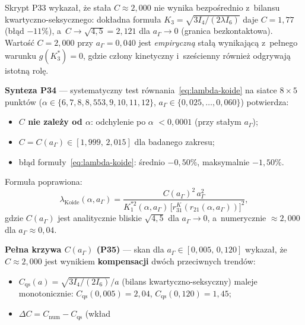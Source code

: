 \begin{problem}
\begin{description}[leftmargin=2em, labelindent=0pt]
\item[Weryfikacja na siatce --- \textbf{P33--P34 (domkni\k{e}te)}:]
  Skrypt P33 wykaza\l{}, \.ze sta\l{}a $C \approx 2{,}000$
  nie wynika bezpo\'srednio z~bilansu kwartyczno-seksycznego:
  dok\l{}adna formu\l{}a $K_3 = \sqrt{3I_4/(2\lambda I_6)}$
  daje $C = 1{,}77$ (b\l{}\k{a}d $-11\%$), a~$C \to \sqrt{4{,}5} = 2{,}121$
  dla $a_\Gamma \to 0$ (granica bezkontaktowa).
  Warto\'s\'c $C = 2{,}000$ przy $a_\Gamma = 0{,}040$ jest
  \emph{empiryczn\k{a}} sta\l{}\k{a} wynikaj\k{a}c\k{a} z~pe\l{}nego
  warunku $g(K_3^*) = 0$, gdzie cz\l{}ony kinetyczny i~sze\'scienny
  r\'ownie\.z odgrywaj\k{a} istotn\k{a} rol\k{e}.
  \par
  \textbf{Synteza P34} --- systematyczny test r\'ownania~\eqref{eq:lambda-koide}
  na siatce $8 \times 5$ punkt\'ow
  ($\alpha \in \{6,7,8,8{,}553,9,10,11,12\}$,
   $a_\Gamma \in \{0{,}025,\ldots,0{,}060\}$)
  potwierdza:
  \begin{itemize}[nosep]
    \item \textbf{$C$ nie zale\.zy od $\alpha$}: odchylenie po $\alpha$
          $< 0{,}0001$ (przy sta\l{}ym $a_\Gamma$);
    \item $C = C(a_\Gamma) \in [1{,}999,\, 2{,}015]$ dla badanego zakresu;
    \item b\l{}\k{a}d formu\l{}y~\eqref{eq:lambda-koide}:
          \'srednio $-0{,}50\%$, maksymalnie $-1{,}50\%$.
  \end{itemize}
  Formu\l{}a poprawiona:
  \begin{equation}\label{eq:lambda-koide-v2}
      \lambda_\mathrm{Koide}(\alpha, a_\Gamma)
      = \frac{C(a_\Gamma)^2\, a_\Gamma^2}
             {K_1^{*2}(\alpha, a_\Gamma)\,
              \bigl[r_{31}^K(r_{21}(\alpha, a_\Gamma))\bigr]^2},
  \end{equation}
  gdzie $C(a_\Gamma)$ jest analitycznie bliskie $\sqrt{4{,}5}$ dla
  $a_\Gamma \to 0$, a~numerycznie $\approx 2{,}000$ dla
  $a_\Gamma \approx 0{,}04$.
  \par
  \textbf{Pe\l{}na krzywa $C(a_\Gamma)$ (P35)} --- skan dla
  $a_\Gamma \in [0{,}005,\, 0{,}120]$ wykaza\l{}, \.ze $C \approx 2{,}000$
  jest wynikiem \textbf{kompensacji} dw\'och przeciwnych trend\'ow:
  \begin{itemize}[nosep]
    \item $C_\mathrm{qs}(a) = \sqrt{3I_4/(2I_6)}/a$ (bilans kwartyczno-seksyczny)
          maleje monotonicznie: $C_\mathrm{qs}(0{,}005) = 2{,}04$,
          $C_\mathrm{qs}(0{,}120) = 1{,}45$;
    \item $\Delta C = C_\mathrm{num} - C_\mathrm{qs}$ (wk\l{}ad

\end{itemize}
\end{description}
\end{problem}
